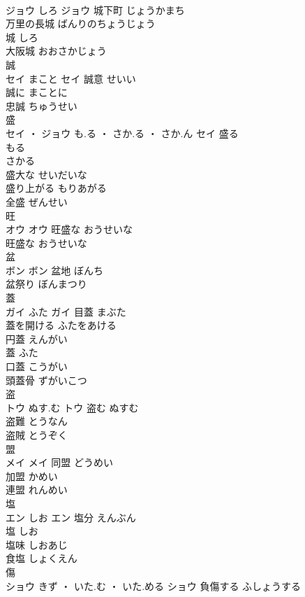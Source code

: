 \documentclass[8pt]{extreport}
\begin{document}
\begin{CJK}{UTF8}{min}
\\	ジョウ	しろ	ジョウ	城下町	じょうかまち	
\\	万里の長城	ばんりのちょうじょう	
\\	城	しろ	
\\	大阪城	おおさかじょう	
\\	誠	
\\	セイ	まこと	セイ	誠意	せいい	
\\	誠に	まことに	
\\	忠誠	ちゅうせい	
\\	盛	
\\	セイ ・ ジョウ	も.る ・ さか.る ・ さか.ん	セイ	盛る 
\\	もる 
\\	さかる	
\\	盛大な	せいだいな	
\\	盛り上がる	もりあがる	
\\	全盛	ぜんせい	
\\	旺	
\\	オウ		オウ	旺盛な	おうせいな	
\\	旺盛な	おうせいな	
\\	盆	
\\	ボン		ボン	盆地	ぼんち	
\\	盆祭り	ぼんまつり	
\\	蓋	
\\	ガイ	ふた	ガイ	目蓋	まぶた	
\\	蓋を開ける	ふたをあける	
\\	円蓋	えんがい	
\\	蓋	ふた	
\\	口蓋	こうがい	
\\	頭蓋骨	ずがいこつ	
\\	盗	
\\	トウ	ぬす.む	トウ	盗む	ぬすむ	
\\	盗難	とうなん	
\\	盗賊	とうぞく	
\\	盟	
\\	メイ		メイ	同盟	どうめい	
\\	加盟	かめい	
\\	連盟	れんめい	
\\	塩	
\\	エン	しお	エン	塩分	えんぶん	
\\	塩	しお	
\\	塩味	しおあじ	
\\	食塩	しょくえん	
\\	傷	
\\	ショウ	きず ・ いた.む ・ いた.める	ショウ	負傷する	ふしょうする	

\end{CJK}
\end{document}
